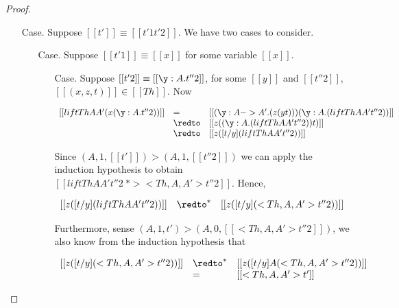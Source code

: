 \begin{proof}
\begin{itemize}
  \item[Case.] Suppose $[[t']] \equiv [[t'1 t'2]]$. We have two cases to consider.
    \begin{itemize}
    \item[Case.] Suppose $[[t'1]] \equiv [[x]]$ for some variable $[[x]]$. 
      \begin{itemize}
      \item[Case.] Suppose $[[t'2]] \equiv [[\y:A.t''2]]$, for some $[[y]]$ and $[[t''2]]$,
        $[[(x,z,t)]] \in [[Th]]$. 
        Now
        \begin{center}
          \begin{math}
            \begin{array}{lll}
              [[lift Th A A' (x (\y:A.t''2))]] & = & [[(\y:A->A'.(z (y t))) (\y:A.(lift Th A A' t''2))]]\\
              & \redto & [[z ((\y:A.(lift Th A A' t''2)) t)]]\\
              & \redto & [[z ([t/y](lift Th A A' t''2))]]\\
            \end{array}
          \end{math}
        \end{center}
        Since 
        $(A,1,[[t']]) > (A,1,[[t''2]])$ we can apply the induction
        hypothesis to obtain $[[lift Th A A' t''2 ~*> <Th,A,A'>t''2]]$. Hence,
        \begin{center}
          \begin{math}
            \begin{array}{lll}
              [[z ([t/y](lift Th A A' t''2))]] & \redto^* & [[z ([t/y](<Th,A,A'>t''2))]]\\
            \end{array}
          \end{math}
        \end{center}
        Furthermore, sense $(A,1,t') > (A,0,[[<Th,A,A'>t''2]])$, we also know from the induction hypothesis that 
        \begin{center}
          \begin{math}
            \begin{array}{lll}
              [[z ([t/y](<Th,A,A'>t''2))]] & \redto^* & [[z ([t/y] A (<Th,A,A'>t''2))]]\\
              & =        & [[<Th,A,A'>t']]\\
            \end{array}
          \end{math}
        \end{center}


\end{itemize}
\end{itemize}
\end{itemize}
\end{proof}
